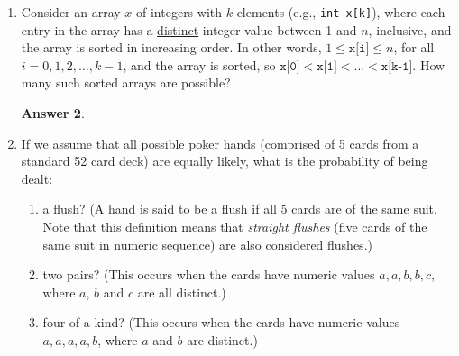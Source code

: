 \documentclass[12pt]{article}
\renewcommand{\(}{\left(}
\renewcommand{\)}{\right)}
\theoremstyle{definition}
\newtheorem*{answer}{Answer}
\begin{document}
\begin{enumerate}
\begin{enumerate}[label=\alph*.]
    \item an investment must be made in each company?
    \item investments must be made in at least 3 of the 4 companies?

    \end{enumerate}

    \begin{shaded}
    \begin{answer}

    \end{answer}
    \end{shaded}
    \newpage


\item Consider an array $x$ of integers with $k$ elements (e.g., \texttt{int x[k]}), where each entry in the array has a \underline{distinct} integer value between 1 and $n$, inclusive, and the array is sorted in increasing order. In other words, $1 \leq \texttt{x[i]} \leq n$, for all $i = 0, 1, 2, \dotsc, k - 1$, and the array is sorted, so $\texttt{x[0]} < \texttt{x[1]} < \dotsc < \texttt{x[k-1]}$.  How many such sorted arrays are possible?

    \begin{shaded}
    \begin{answer}

    \end{answer}
    \end{shaded}
    \newpage


\item If we assume that all possible poker hands (comprised of 5 cards from a standard 52 card deck) are equally likely, what is the probability of being dealt:
    \begin{enumerate}[label=\alph*.]

    \item a flush?  (A hand is said to be a flush if all 5 cards are of the same suit.  Note that this definition means that \emph{straight flushes} (five cards of the same suit in numeric sequence) are also considered flushes.)
    \item two pairs?  (This occurs when the cards have numeric values $a, a, b, b, c$, where $a$, $b$ and $c$ are all distinct.)
    \item four of a kind?  (This occurs when the cards have numeric values $a, a, a, a, b$, where $a$ and $b$ are distinct.)

    \end{enumerate}


\end{enumerate}
\end{document}
